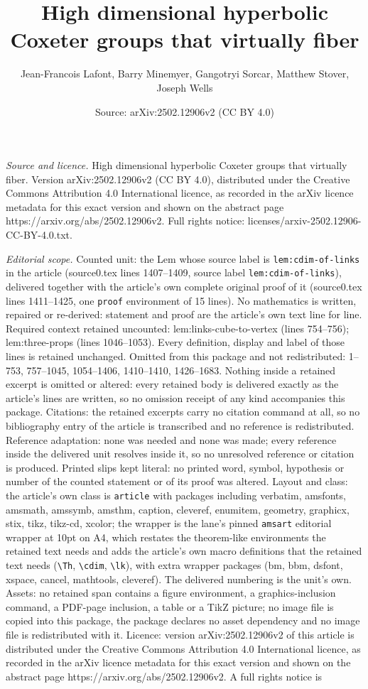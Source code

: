 \documentclass[10pt,a4paper]{amsart}
\title[High dimensional hyperbolic Coxeter groups that virtually fi]{High dimensional hyperbolic Coxeter groups that virtually fiber}
\author{Jean-Francois Lafont, Barry Minemyer, Gangotryi Sorcar, Matthew Stover, Joseph Wells}
\date{Source: arXiv:2502.12906v2 (CC BY 4.0)}
\begin{document}
\maketitle

\noindent\emph{Source and licence.} High dimensional hyperbolic Coxeter groups that virtually fiber. Version arXiv:2502.12906v2 (CC BY 4.0), distributed under the Creative Commons Attribution 4.0 International licence, as recorded in the arXiv licence metadata for this exact version and shown on the abstract page https://arxiv.org/abs/2502.12906v2. Full rights notice: licenses/arxiv-2502.12906-CC-BY-4.0.txt.\par\smallskip

\noindent\textit{Editorial scope.} Counted unit: the Lem whose source label is \texttt{lem:cdim-of-links} in the article (source0.tex lines 1407--1409, source label \texttt{lem:cdim-of-links}), delivered together with the article's own complete original proof of it (source0.tex lines 1411--1425, one \texttt{proof} environment of 15 lines). No mathematics is written, repaired or re-derived: statement and proof are the article's own text line for line. Required context retained uncounted: lem:links-cube-to-vertex (lines 754--756); lem:three-props (lines 1046--1053). Every definition, display and label of those lines is retained unchanged. Omitted from this package and not redistributed: 1--753, 757--1045, 1054--1406, 1410--1410, 1426--1683. Nothing inside a retained excerpt is omitted or altered: every retained body is delivered exactly as the article's lines are written, so no omission receipt of any kind accompanies this package. Citations: the retained excerpts carry no citation command at all, so no bibliography entry of the article is transcribed and no reference is redistributed. Reference adaptation: none was needed and none was made; every reference inside the delivered unit resolves inside it, so no unresolved reference or citation is produced. Printed slips kept literal: no printed word, symbol, hypothesis or number of the counted statement or of its proof was altered. Layout and class: the article's own class is \texttt{article} with packages including verbatim, amsfonts, amsmath, amssymb, amsthm, caption, cleveref, enumitem, geometry, graphicx, stix, tikz, tikz-cd, xcolor; the wrapper is the lane's pinned \texttt{amsart} editorial wrapper at 10pt on A4, which restates the theorem-like environments the retained text needs and adds the article's own macro definitions that the retained text needs (\texttt{\textbackslash Th}, \texttt{\textbackslash cdim}, \texttt{\textbackslash lk}), with extra wrapper packages (bm, bbm, dsfont, xspace, cancel, mathtools, cleveref). The delivered numbering is the unit's own. Assets: no retained span contains a figure environment, a graphics-inclusion command, a PDF-page inclusion, a table or a TikZ picture; no image file is copied into this package, the package declares no asset dependency and no image file is redistributed with it. Licence: version arXiv:2502.12906v2 of this article is distributed under the Creative Commons Attribution 4.0 International licence, as recorded in the arXiv licence metadata for this exact version and shown on the abstract page https://arxiv.org/abs/2502.12906v2. A full rights notice is 
\end{document}
